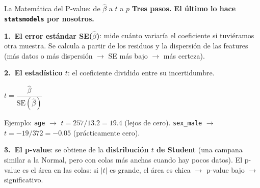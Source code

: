 \documentclass[aspectratio=169, 11pt]{beamer}
\begin{document}
\begin{frame}[shrink=20]{La Matemática del P-value: de $\hat{\beta}$ a $t$ a $p$}
  \vspace{-4pt}
  {\footnotesize\color{arcaDark}\bfseries
    Tres pasos. El último lo hace \texttt{statsmodels} por nosotros.}

  \vspace{8pt}
  {\footnotesize
  \textbf{1.\ El error estándar SE($\hat{\beta}$)}: mide cuánto variaría
  el coeficiente si tuviéramos otra muestra. Se calcula a partir de
  los residuos y la dispersión de las features (más datos o más
  dispersión $\to$ SE más bajo $\to$ más certeza).

  \vspace{6pt}
  \textbf{2.\ El estadístico $t$}: el coeficiente dividido entre su incertidumbre.
  }

  \vspace{4pt}
  \begin{center}
    \begin{tcolorbox}[colback=arcaGray, colframe=arcaRed, boxrule=1pt,
                      arc=4pt, width=0.45\textwidth]
    \centering
    \large
    $t = \dfrac{\hat{\beta}}{\text{SE}(\hat{\beta})}$
    \end{tcolorbox}
  \end{center}

  \vspace{4pt}
  {\footnotesize
  Ejemplo: \texttt{age} $\to$ $t = 257/13.2 = 19.4$ (lejos de cero).
  \texttt{sex\_male} $\to$ $t = -19/372 = -0.05$ (prácticamente cero).

  \vspace{6pt}
  \textbf{3.\ El p-value}: se obtiene de la \textbf{distribución $t$ de Student}
  (una campana similar a la Normal, pero con colas más anchas cuando
  hay pocos datos). El p-value es el área en las colas: si $|t|$ es
  grande, el área es chica $\to$ p-value bajo $\to$ significativo.
  }
\end{frame}
\end{document}
